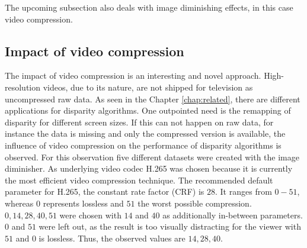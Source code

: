 \noindent The upcoming subsection also deals with image diminishing effects, in this case video compression.

\subsection{Impact of video compression}

The impact of video compression is an interesting and novel approach.
High-resolution videos, due to its nature, are not shipped for television as uncompressed raw data.
As seen in the Chapter \ref{chap:related}, there are different applications for disparity algorithms.
One outpointed need is the remapping of disparity for different screen sizes.
If this can not happen on raw data, for instance the data is missing and only the compressed version is available, the influence of video compression on the performance of disparity algorithms is observed.
\noindent For this observation five different datasets were created with the image diminisher.
As underlying video codec H.265 was chosen because it is currently the most efficient video compression technique.
The recommended default parameter for H.265, the constant rate factor (CRF) is $28$.
It ranges from $0-51$, whereas $0$ represents lossless and $51$ the worst possible compression.
$0, 14, 28, 40, 51$ were chosen with $14$ and $40$ as additionally in-between parameters.
$0$ and $51$ were left out, as the result is too visually distracting for the viewer with $51$ and $0$ is lossless.
Thus, the observed values are $14, 28, 40$.

